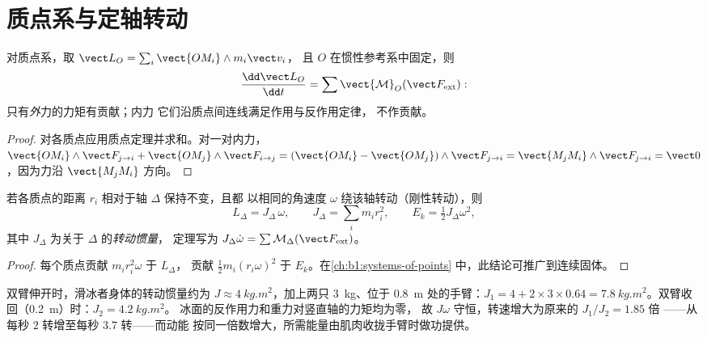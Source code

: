 \section{质点系与定轴转动}

\begin{theorem}[质点系的角动量]\label{thm:b1:angular-momentum:system}
对质点系，取 $\vect L_O = \sum_i\vect{OM_i}\wedge m_i\vect v_i$，
且 $O$ 在惯性参考系中固定，则
\[
\frac{\dd\vect L_O}{\dd t} = \sum\vect{\mathcal M}_O(\vect F_{\mathrm{ext}}):
\]
只有\emph{外}力的力矩有贡献；内力
它们沿质点间连线满足作用与反作用定律，
不作贡献。
\end{theorem}

\begin{proof}
对各质点应用质点定理并求和。对一对内力，$\vect{OM_i}\wedge\vect F_{j\to i}
+ \vect{OM_j}\wedge\vect F_{i\to j} = (\vect{OM_i} - \vect{OM_j})\wedge\vect F_{j\to i}
= \vect{M_jM_i}\wedge\vect F_{j\to i} = \vect 0$，因为力沿
$\vect{M_jM_i}$ 方向。
\end{proof}

\begin{proposition}[刚性定轴转动]\label{prop:b1:angular-momentum:inertia}
若各质点的距离 $r_i$ 相对于轴 $\Delta$ 保持不变，且都
以相同的角速度 $\omega$ 绕该轴转动（刚性转动），则
\[
L_\Delta = J_\Delta\,\omega, \qquad J_\Delta = \sum_i m_ir_i^2, \qquad
E_k = \tfrac12 J_\Delta\omega^2,
\]
其中 $J_\Delta$ 为关于 $\Delta$ 的\emph{转动惯量}，
定理写为 $J_\Delta\dot\omega = \sum\mathcal M_\Delta(\vect F_{\mathrm{ext}})$。
\end{proposition}

\begin{proof}
每个质点贡献 $m_ir_i^2\omega$ 于 $L_\Delta$，
贡献 $\tfrac12 m_i(r_i\omega)^2$ 于 $E_k$。在\cref{ch:b1:systems-of-points}
中，此结论可推广到连续固体。
\end{proof}

\begin{example}[滑冰者]\label{ex:b1:angular-momentum:skater}
双臂伸开时，滑冰者身体的转动惯量约为 $J \approx \qty{4}{kg.m^2}$，加上两只
\qty{3}{kg}、位于 \qty{0.8}{m} 处的手臂：$J_1 = 4 + 2 \times 3 \times 0.64 =
\qty{7.8}{kg.m^2}$。双臂收回（\qty{0.2}{m}）时：$J_2 = \qty{4.2}{kg.m^2}$。
冰面的反作用力和重力对竖直轴的力矩均为零，
故 $J\omega$ 守恒，转速增大为原来的 $J_1/J_2 = 1.85$ 倍
——从每秒 $2$ 转增至每秒 $3.7$ 转——而动能
按同一倍数增大，所需能量由肌肉收拢手臂时做功提供。
\end{example}

